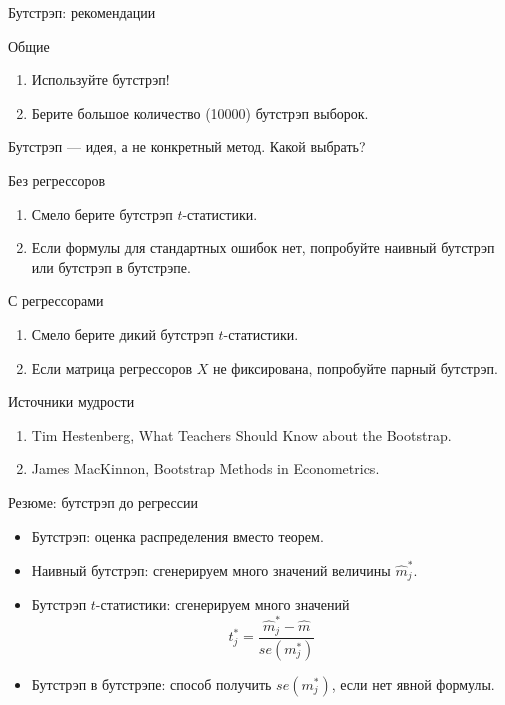 \begin{frame}{Бутстрэп: рекомендации}

\alert{Общие}
\begin{enumerate}[<+->]
    \item Используйте бутстрэп!
    \item Берите большое количество (10000) бутстрэп выборок. 
\end{enumerate}

\pause
Бутстрэп — идея, а не конкретный метод. Какой выбрать?

\pause
\alert{Без регрессоров}

\begin{enumerate}[<+->]
    \item Смело берите бутстрэп $t$-статистики.
    \item Если формулы для стандартных ошибок нет, попробуйте наивный бутстрэп или бутстрэп в бутстрэпе.
\end{enumerate}    

\pause
\alert{С регрессорами}
\begin{enumerate}[<+->]
    \item Смело берите дикий бутстрэп $t$-статистики.
    \item Если матрица регрессоров $X$ не фиксирована, попробуйте парный бутстрэп.
\end{enumerate}    

\end{frame}




\begin{frame}{Источники мудрости}

\begin{enumerate}[<+->]
    \item Tim Hestenberg, What Teachers Should Know about the Bootstrap.
    \item James MacKinnon, Bootstrap Methods in Econometrics.
\end{enumerate}

\end{frame}


\begin{frame}{Резюме: бутстрэп до регрессии}


\begin{itemize}[<+->]
\item Бутстрэп: оценка распределения вместо теорем.
\item Наивный бутстрэп: сгенерируем много значений величины $\hat m^*_j$. 
\item Бутстрэп $t$-статистики: сгенерируем много значений 
\[
t^*_j = \frac{\hat m^*_j - \hat m}{se(m^*_j)}
\]
\item Бутстрэп в бутстрэпе: способ получить $se(m^*_j)$, если нет явной формулы.
\end{itemize}


\end{frame}
    



